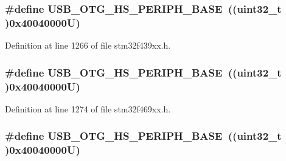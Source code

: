 \subsubsection[{\texorpdfstring{U\+S\+B\+\_\+\+O\+T\+G\+\_\+\+H\+S\+\_\+\+P\+E\+R\+I\+P\+H\+\_\+\+B\+A\+SE}{USB_OTG_HS_PERIPH_BASE}}]{\setlength{\rightskip}{0pt plus 5cm}\#define U\+S\+B\+\_\+\+O\+T\+G\+\_\+\+H\+S\+\_\+\+P\+E\+R\+I\+P\+H\+\_\+\+B\+A\+SE~((uint32\+\_\+t )0x40040000\+U)}\hypertarget{group___peripheral__memory__map_gaa405d2ebfd7e9394237b6639f16a5409}{}\label{group___peripheral__memory__map_gaa405d2ebfd7e9394237b6639f16a5409}


Definition at line 1266 of file stm32f439xx.\+h.

\subsubsection[{\texorpdfstring{U\+S\+B\+\_\+\+O\+T\+G\+\_\+\+H\+S\+\_\+\+P\+E\+R\+I\+P\+H\+\_\+\+B\+A\+SE}{USB_OTG_HS_PERIPH_BASE}}]{\setlength{\rightskip}{0pt plus 5cm}\#define U\+S\+B\+\_\+\+O\+T\+G\+\_\+\+H\+S\+\_\+\+P\+E\+R\+I\+P\+H\+\_\+\+B\+A\+SE~((uint32\+\_\+t )0x40040000\+U)}\hypertarget{group___peripheral__memory__map_gaa405d2ebfd7e9394237b6639f16a5409}{}\label{group___peripheral__memory__map_gaa405d2ebfd7e9394237b6639f16a5409}


Definition at line 1274 of file stm32f469xx.\+h.

\subsubsection[{\texorpdfstring{U\+S\+B\+\_\+\+O\+T\+G\+\_\+\+H\+S\+\_\+\+P\+E\+R\+I\+P\+H\+\_\+\+B\+A\+SE}{USB_OTG_HS_PERIPH_BASE}}]{\setlength{\rightskip}{0pt plus 5cm}\#define U\+S\+B\+\_\+\+O\+T\+G\+\_\+\+H\+S\+\_\+\+P\+E\+R\+I\+P\+H\+\_\+\+B\+A\+SE~((uint32\+\_\+t )0x40040000\+U)}\hypertarget{group___peripheral__memory__map_gaa405d2ebfd7e9394237b6639f16a5409}{}\label{group___peripheral__memory__map_gaa405d2ebfd7e9394237b6639f16a5409}


